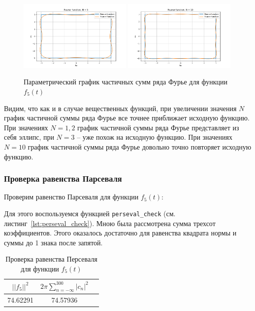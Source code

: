 \begin{figure}[ht!]
    \includegraphics[width=0.49\textwidth]{media/plots/func_5_N_5.png}
    \includegraphics[width=0.49\textwidth]{media/plots/func_5_N_10.png}
    \caption{Параметрический график частичных сумм ряда Фурье для функции $f_5(t)$}
    \label{fig:func_5_plot}
\end{figure}

Видим, что как и в случае вещественных функций, при увеличении значения $N$ график частичной суммы ряда Фурье все точнее приближает исходную функцию. 
При значениях $N = 1, 2$ график частичной суммы ряда Фурье представляет из себя эллипс, при $N = 3$ -- уже похож на исходную функцию.
При значениях $N = 10$ график частичной суммы ряда Фурье довольно точно повторяет исходную функцию.

\FloatBarrier
\subsubsection{Проверка равенства Парсеваля}

Проверим равенство Парсеваля для функции $f_5(t)$:

Для этого воспользуемся функцией \texttt{perseval\_check} (см. листинг~\ref{lst:perseval_check}).
Мною была рассмотрена сумма трехсот коэффициентов. Этого оказалось достаточно для равенства квадрата нормы и суммы до 1 знака после запятой. 

\begin{table}[ht!]
    \centering
    \begin{tabular}{|c|c|c|}
        \hline
        $||f_5||^2$ & $2\pi \sum\limits_{n = -\infty}^{300} |c_n|^2$ \\
        \hline
        74.62291 & 74.57936 \\
        \hline
    \end{tabular}
    \caption{Проверка равенства Персеваля для функции $f_5(t)$}
    \label{tab:func_5_pers}
\end{table}

